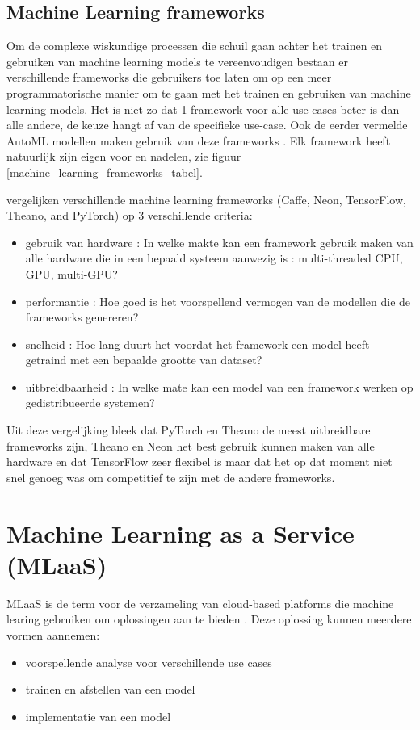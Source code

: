 \subsection{Machine Learning frameworks}
Om de complexe wiskundige processen die schuil gaan achter het trainen en gebruiken van machine learning models te vereenvoudigen bestaan er verschillende frameworks die gebruikers toe laten om op een meer programmatorische manier om te gaan met het trainen en gebruiken van machine learning models. Het is niet zo dat 1 framework voor alle use-cases beter is dan alle andere, de keuze hangt af van de specifieke use-case. Ook de eerder vermelde AutoML modellen maken gebruik van deze frameworks \autocite{Bahrampour2015}. Elk framework heeft natuurlijk zijn eigen voor en nadelen, zie figuur \ref{machine_learning_frameworks_tabel}.

\autocite{ProjectPro2023}
\textcite{Bahrampour2015} vergelijken verschillende machine learning frameworks (Caffe, Neon, TensorFlow, Theano, and PyTorch) op 3 verschillende criteria:
\begin{itemize}[]
\item gebruik van hardware : In welke makte kan een framework gebruik maken van alle hardware die in een bepaald systeem aanwezig is : multi-threaded CPU, GPU, multi-GPU?
\item performantie : Hoe goed is het voorspellend vermogen van de modellen die de frameworks genereren?
\item snelheid : Hoe lang duurt het voordat het framework een model heeft getraind met een bepaalde grootte van dataset?
\item uitbreidbaarheid : In welke mate kan een model van een framework werken op gedistribueerde systemen?
\end{itemize}
Uit deze vergelijking bleek dat PyTorch en Theano de meest uitbreidbare frameworks zijn, Theano en Neon het best gebruik kunnen maken van alle hardware en dat TensorFlow zeer flexibel is maar dat het op dat moment niet snel genoeg was om competitief  te zijn met de andere frameworks. 

\section{Machine Learning as a Service (MLaaS)}
MLaaS is de term voor de verzameling van cloud-based platforms die machine learing gebruiken om oplossingen aan te bieden \autocite{Onose2022}. Deze oplossing kunnen meerdere vormen aannemen: 
\begin{itemize}
    \item voorspellende analyse voor verschillende use cases
    \item trainen en afstellen van een model
    \item implementatie van een model
\end{itemize}

